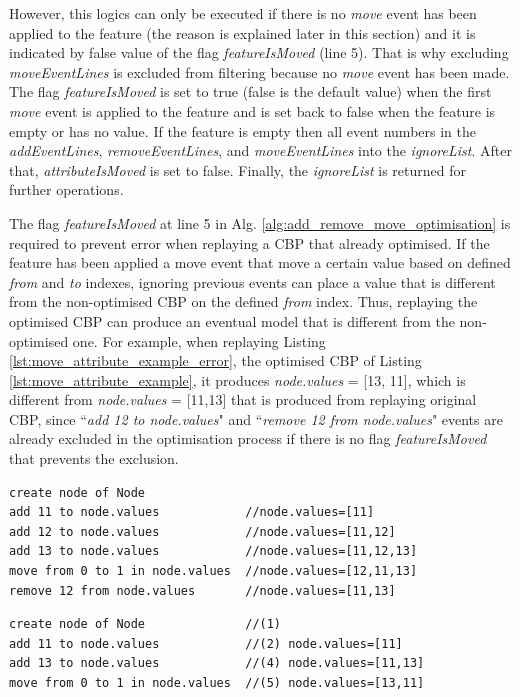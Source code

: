 \documentclass{llncs}
\begin{document}
However, this logics can only be executed if there is no \emph{move} event has been applied to the feature (the reason is explained later in this section) and it is indicated by false value of the flag \emph{featureIsMoved} (line 5). That is why excluding \emph{moveEventLines} is excluded from filtering because no \emph{move} event has been made. The flag \emph{featureIsMoved} is set to true (false is the default value) when the first \emph{move} event is applied to the feature and is set back to false when the feature is empty or has no value. If the feature is empty then all event numbers in the \emph{addEventLines}, \emph{removeEventLines}, and \emph{moveEventLines} into the \emph{ignoreList}. After that, \emph{attributeIsMoved} is set to false. Finally, the \emph{ignoreList} is returned for further operations.





The flag \emph{featureIsMoved} at line 5 in Alg. \ref{alg:add_remove_move_optimisation} is required to prevent error when replaying a CBP that already optimised. If the feature has been applied a move event that move a certain value based on defined \emph{from} and \emph{to} indexes, ignoring previous events can place a value that is different from the non-optimised CBP on the defined \emph{from} index. Thus, replaying the optimised CBP can produce an eventual model that is different from the non-optimised one. For example, when replaying Listing \ref{lst:move_attribute_example_error}, the optimised CBP of Listing \ref{lst:move_attribute_example}, it produces \emph{node.values} = [13, 11], which is different from \emph{node.values} = [11,13]  that is produced from replaying original CBP, since ``\emph{add 12 to node.values}" and ``\emph{remove 12 from node.values}" events are already excluded in the optimisation process if there is no flag \emph{featureIsMoved} that prevents the exclusion.


\begin{lstlisting}[style=eol,caption={The CBP representation of attribute \emph{values}'s move event.},label=lst:move_attribute_example]
create node of Node
add 11 to node.values            //node.values=[11] 
add 12 to node.values            //node.values=[11,12] 
add 13 to node.values            //node.values=[11,12,13] 
move from 0 to 1 in node.values  //node.values=[12,11,13]  
remove 12 from node.values       //node.values=[11,13] 
\end{lstlisting}

\begin{lstlisting}[style=eol,caption={The optimised CBP representation of attribute \emph{values}'s event.},label=lst:move_attribute_example_error]
create node of Node              //(1)  
add 11 to node.values            //(2) node.values=[11] 
add 13 to node.values            //(4) node.values=[11,13] 
move from 0 to 1 in node.values  //(5) node.values=[13,11]   
\end{lstlisting}
\end{document}
